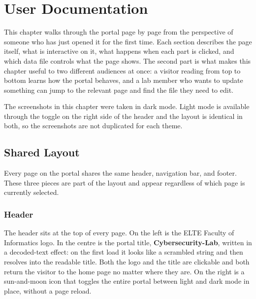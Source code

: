 \chapter{User Documentation}\label{ch:user}

This chapter walks through the portal page by page from the perspective of someone who has just opened it for the first time. Each section describes the page itself, what is interactive on it, what happens when each part is clicked, and which data file controls what the page shows. The second part is what makes this chapter useful to two different audiences at once: a visitor reading from top to bottom learns how the portal behaves, and a lab member who wants to update something can jump to the relevant page and find the file they need to edit.

The screenshots in this chapter were taken in dark mode. Light mode is available through the toggle on the right side of the header and the layout is identical in both, so the screenshots are not duplicated for each theme.

\section{Shared Layout}\label{sec:user-shared}

Every page on the portal shares the same header, navigation bar, and footer. These three pieces are part of the layout and appear regardless of which page is currently selected.

\subsection{Header}\label{subsec:user-header}

The header sits at the top of every page. On the left is the ELTE Faculty of Informatics logo. In the centre is the portal title, \textbf{Cybersecurity-Lab}, written in a decoded-text effect: on the first load it looks like a scrambled string and then resolves into the readable title. Both the logo and the title are clickable and both return the visitor to the home page no matter where they are. On the right is a sun-and-moon icon that toggles the entire portal between light and dark mode in place, without a page reload.

